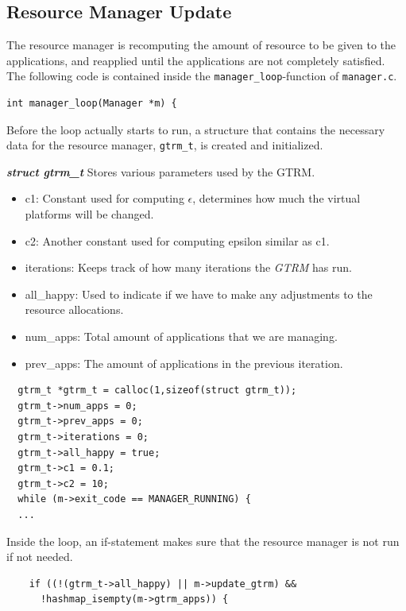 \documentclass[nobiblatex]{LTHthesis}
\begin{document}
\subsection{Resource Manager Update}
The resource manager is recomputing the amount of resource to be given to
the applications, and reapplied until the applications are not completely
satisfied. The following code is contained inside the 
\texttt{manager\_loop}-function of \texttt{manager.c}.

\begin{lstlisting}
int manager_loop(Manager *m) {
\end{lstlisting}

Before the loop actually starts to run, a structure that contains the
necessary data for the resource manager, \texttt{gtrm\_t}, is created 
and initialized.

\begin{framed}
	\begin{flushleft}
			\textbf{\emph{{struct gtrm\_t}}} \newline
			Stores various parameters used by the GTRM.
			\begin{itemize}
			\item c1: Constant used for computing $\epsilon$, determines how much 
        the virtual platforms will be changed.
			\item c2: Another constant used for computing epsilon similar as c1.
			\item iterations: Keeps track of how many iterations the \emph{GTRM} has run.
			\item all\_happy: Used to indicate if we have to make any adjustments 
        to the resource allocations.
			\item num\_apps: Total amount of applications that we are managing.
			\item prev\_apps: The amount of applications in the previous iteration.
			\end{itemize}
	\end{flushleft}	
\end{framed}

\begin{lstlisting}
  gtrm_t *gtrm_t = calloc(1,sizeof(struct gtrm_t));
  gtrm_t->num_apps = 0;
  gtrm_t->prev_apps = 0;
  gtrm_t->iterations = 0;
  gtrm_t->all_happy = true;
  gtrm_t->c1 = 0.1;
  gtrm_t->c2 = 10;
  while (m->exit_code == MANAGER_RUNNING) {
  ...
\end{lstlisting}
Inside the loop, an if-statement makes sure that the resource manager is not run if not needed. 
\begin{lstlisting}
    if ((!(gtrm_t->all_happy) || m->update_gtrm) && 
      !hashmap_isempty(m->gtrm_apps)) {
\end{lstlisting}
\end{document}
